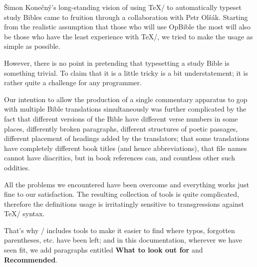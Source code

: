 {Šimon Konečný's long-standing vision of using \TeX/ to automatically typeset study Bibles came to fruition through a collaboration with Petr Olšák.  Starting from the realistic assumption that
those who will use OpBible the most will also be those who have the least experience with \TeX/, we tried to make the usage as simple as possible.

However, there is no point in pretending that typesetting a study Bible is something trivial.  
To claim that it is a little tricky is a bit understatement;
it is rather quite a challenge for any programmer.

Our intention to allow the production of a single commentary apparatus to gop with multiple Bible translations simultaneously was
further complicated by the fact that different versions of the Bible have different verse numbers in some places, differently broken paragraphs, 
different structures of poetic passages, different placement of headings added by the translators; that  some translations have completely different book titles (and hence abbreviations),
that file names cannot have diacritics, but in book references can, and countless other such oddities.

All the problems we encountered have been overcome and everything works just fine to our satisfaction.  The resulting collection of tools is quite complicated,
therefore  the definitions usage is irritatingly sensitive to transgressions against \TeX/ syntax.

That's why \OpBible/ includes tools to make it easier to find where typos, forgotten parentheses, etc. have been left; and in this documentation,
wherever we have seen fit, we add paragraphs entitled {\bf What to look out for} and {\bf Recommended}.




\vfill 

\eject








%

}
